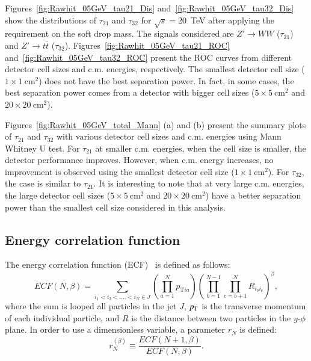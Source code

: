 Figures~\ref{fig:Rawhit_05GeV_tau21_Dis} and~\ref{fig:Rawhit_05GeV_tau32_Dis} 
show the distributions of $\tau_{21}$ and $\tau_{32}$ for $\sqrt{s}=20$~TeV 
after applying the requirement on the soft drop mass. The signals considered are 
$Z'\rightarrow WW$ ($\tau_{21}$) and 
$Z' \rightarrow t\bar{t}$ ($\tau_{32}$). 
Figures~\ref{fig:Rawhit_05GeV_tau21_ROC} and~\ref{fig:Rawhit_05GeV_tau32_ROC} 
present the ROC curves from different detector cell sizes and c.m. energies, 
respectively. The smallest detector cell size ($1\times1~\mathrm{cm}^2$) 
does not have the best separation power. In fact, in some cases, 
the best separation power comes from a detector with bigger cell sizes 
($5\times5~\mathrm{cm}^2$ and $20\times20~\mathrm{cm}^2$).

Figures~\ref{fig:Rawhit_05GeV_total_Mann} (a) and (b) present the summary plots of $\tau_{21}$ and $\tau_{32}$ with various detector cell sizes and c.m. energies using Mann Whitney U test. For $\tau_{21}$ at smaller c.m. energies, when 
the cell size is smaller, the detector performance improves. However, 
when c.m. energy increases, no improvement 
is observed using the smallest detector cell size ($1\times1~\mathrm{cm}^2$). 
For $\tau_{32}$, the case is similar to  $\tau_{21}$. It is interesting to note that at very large  
c.m. energies, the large detector cell sizes ($5\times5~\mathrm{cm}^2$ and $20\times20~\mathrm{cm}^2$) have a 
better separation power than the smallest 
cell  size considered in this analysis. 

\subsection{Energy correlation function \label{sec:ecf}}
The energy correlation function (ECF)~\cite{Larkoski:2013eya} is defined as follows: 
\begin{equation} \label{eq:ECF_Modified}
ECF(N,\beta)=\sum_{i_{1}<i_{2}<....<i_{N}\in J} \left(\prod_{a=1}^{N}p_{\mathrm{T}ia}\right)\left(\prod_{b=1}^{N-1}\prod_{c=b+1}^{N} R_{i_{b}i_{c}}\right)^{\beta},
\end{equation}
where the sum is looped all particles in the jet $J$, $p_{\mathrm{T}}$ is the transverse 
momentum of each individual particle, and $R$ is the distance between two 
particles in the $y$-$\phi$ plane.  
In order to use a dimensionless variable, a parameter $r_{N}$ is defined:
\begin{equation} \label{eq:ECF_ratio}
r_{N}^{(\beta)}\equiv\frac{ECF(N+1,\beta)}{ECF(N,\beta)}.
\end{equation}

